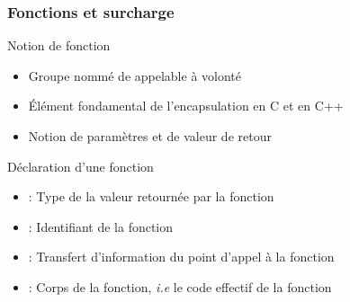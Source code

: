 \documentclass[svgnames]{beamer}
\begin{document}
\frame
{
  \frametitle{Fonctions et surcharge}
  \begin{block}{Notion de fonction}
  \begin{itemize}
  \item Groupe nommé de  appelable à volonté
  \item Élément fondamental de l'encapsulation en C et en C++
  \item Notion de paramètres et de valeur de retour
  \end{itemize}
  \end{block}{}

{
  \begin{block}{Déclaration d'une fonction}\footnotesize
  \begin{center}\footnotesize{}\end{center}
  \vspace{-0.5cm}
  \begin{itemize}\footnotesize
  \item {} : Type de la valeur retournée par la fonction
  \item {} : Identifiant de la fonction
  \item {} : Transfert d'information du point d'appel à la fonction
  \item {} : Corps de la fonction, \textit{i.e} le code effectif de la fonction
  \end{itemize}
  \end{block}{}
}

}
\end{document}
